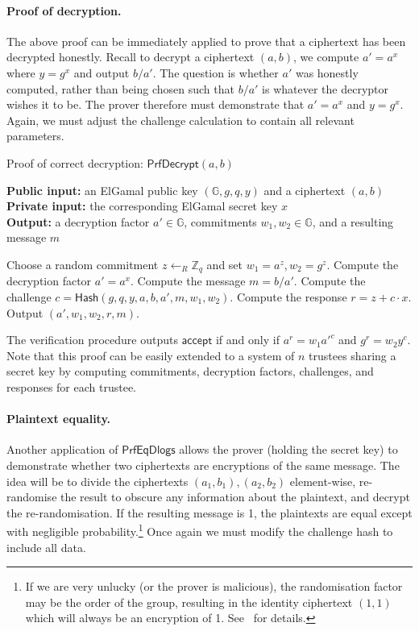 \documentclass[12pt,a4paper]{article}
\theoremstyle{definition}
\begin{document}
\paragraph{Proof of decryption.}
The above proof can be immediately applied to prove that a ciphertext has been decrypted honestly. Recall to decrypt a ciphertext $(a, b)$, we compute $a' = a^x$ where $y=g^x$ and output $b/a'$. The question is whether $a'$ was honestly computed, rather than being chosen such that $b/a'$ is whatever the decryptor wishes it to be. The prover therefore must demonstrate that $a'=a^x$ and $y=g^x$. Again, we must adjust the challenge calculation to contain all relevant parameters.
\begin{algorithm}\caption{Proof of correct decryption: $\mathsf{PrfDecrypt}(a, b)$}\label{prot:ProofDecrypt}
    \textbf{Public input:} an ElGamal public key $(\mathbb{G}, g, q, y)$ and a ciphertext $(a, b)$\\
    \textbf{Private input:} the corresponding ElGamal secret key $x$\\
    \textbf{Output:} a decryption factor $a'\in\mathbb{G}$, commitments $w_1, w_2\in\mathbb{G}$, and a resulting message $m$
    \begin{algorithmic}[1]
        \State Choose a random commitment $z\leftarrow_R\mathbb{Z}_q$ and set $w_1 = a^z, w_2 = g^z$.
        \State Compute the decryption factor $a'=a^x$.
        \State Compute the message $m=b/a'$.
        \State Compute the challenge $c=\mathsf{Hash}(g, q, y, a, b, a', m, w_1, w_2)$.
        \State Compute the response $r=z+c\cdot x$.
        \State Output $(a', w_1, w_2, r, m)$.
    \end{algorithmic}
\end{algorithm}
The verification procedure outputs $\mathsf{accept}$ if and only if $a^r=w_1a'^c$ and $g^r=w_2y^c$. Note that this proof can be easily extended to a system of $n$ trustees sharing a secret key by computing commitments, decryption factors, challenges, and responses for each trustee.

\paragraph{Plaintext equality.}
Another application of $\mathsf{PrfEqDlogs}$ allows the prover (holding the secret key) to demonstrate whether two ciphertexts are encryptions of the same message. The idea will be to divide the ciphertexts $(a_1, b_1), (a_2, b_2)$ element-wise, re-randomise the result to obscure any information about the plaintext, and decrypt the re-randomisation.  If the resulting message is 1, the plaintexts are equal except with negligible probability.\footnote{If we are very unlucky (or the prover is malicious), the randomisation factor may be the order of the group, resulting in the identity ciphertext $(1, 1)$ which will always be an encryption of 1. See~\cite{mcmurtry2020test} for details.} Once again we must modify the challenge hash to include all data.
\end{document}
